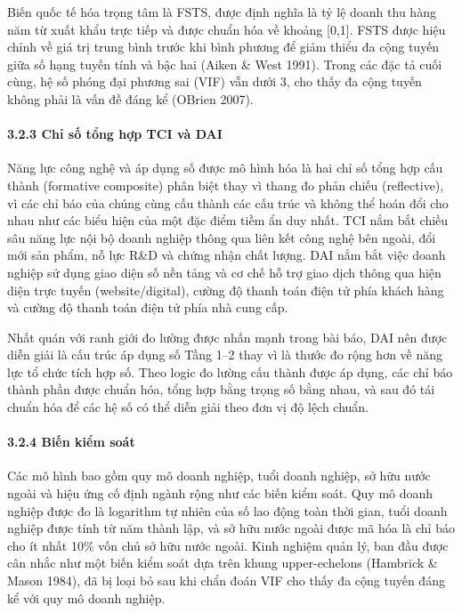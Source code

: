 \documentclass[12pt,a4paper]{article}
\begin{document}
Biến quốc tế hóa trọng tâm là FSTS, được định nghĩa là tỷ lệ doanh thu
hàng năm từ xuất khẩu trực tiếp và được chuẩn hóa về khoảng {[}0,1{]}.
FSTS được hiệu chỉnh về giá trị trung bình trước khi bình phương để giảm
thiểu đa cộng tuyến giữa số hạng tuyến tính và bậc hai (Aiken \& West
1991). Trong các đặc tả cuối cùng, hệ số phóng đại phương sai (VIF) vẫn
dưới 3, cho thấy đa cộng tuyến không phải là vấn đề đáng kể
(O\textquotesingle Brien 2007).

\hypertarget{323-chux1ec9-sux1ed1-tux1ed5ng-hux1ee3p-tci-vuxe0-dai}{%
\paragraph{3.2.3 Chỉ số tổng hợp TCI và
DAI}\label{323-chux1ec9-sux1ed1-tux1ed5ng-hux1ee3p-tci-vuxe0-dai}}

Năng lực công nghệ và áp dụng số được mô hình hóa là hai chỉ số tổng hợp
cấu thành (formative composite) phân biệt thay vì thang đo phản chiếu
(reflective), vì các chỉ báo của chúng cùng cấu thành các cấu trúc và
không thể hoán đổi cho nhau như các biểu hiện của một đặc điểm tiềm ẩn
duy nhất. TCI nắm bắt chiều sâu năng lực nội bộ doanh nghiệp thông qua
liên kết công nghệ bên ngoài, đổi mới sản phẩm, nỗ lực R\&D và chứng
nhận chất lượng. DAI nắm bắt việc doanh nghiệp sử dụng giao diện số nền
tảng và cơ chế hỗ trợ giao dịch thông qua hiện diện trực tuyến
(website/digital), cường độ thanh toán điện tử phía khách hàng và cường
độ thanh toán điện tử phía nhà cung cấp.

Nhất quán với ranh giới đo lường được nhấn mạnh trong bài báo, DAI nên
được diễn giải là cấu trúc áp dụng số Tầng 1--2 thay vì là thước đo rộng
hơn về năng lực tổ chức tích hợp số. Theo logic đo lường cấu thành được
áp dụng, các chỉ báo thành phần được chuẩn hóa, tổng hợp bằng trọng số
bằng nhau, và sau đó tái chuẩn hóa để các hệ số có thể diễn giải theo
đơn vị độ lệch chuẩn.

\hypertarget{324-biux1ebfn-kiux1ec3m-souxe1t}{%
\paragraph{3.2.4 Biến kiểm soát}\label{324-biux1ebfn-kiux1ec3m-souxe1t}}

Các mô hình bao gồm quy mô doanh nghiệp, tuổi doanh nghiệp, sở hữu nước
ngoài và hiệu ứng cố định ngành rộng như các biến kiểm soát. Quy mô
doanh nghiệp được đo là logarithm tự nhiên của số lao động toàn thời
gian, tuổi doanh nghiệp được tính từ năm thành lập, và sở hữu nước ngoài
được mã hóa là chỉ báo cho ít nhất 10\% vốn chủ sở hữu nước ngoài. Kinh
nghiệm quản lý, ban đầu được cân nhắc như một biến kiểm soát dựa trên
khung upper-echelons (Hambrick \& Mason 1984), đã bị loại bỏ sau khi
chẩn đoán VIF cho thấy đa cộng tuyến đáng kể với quy mô doanh nghiệp.
\end{document}
